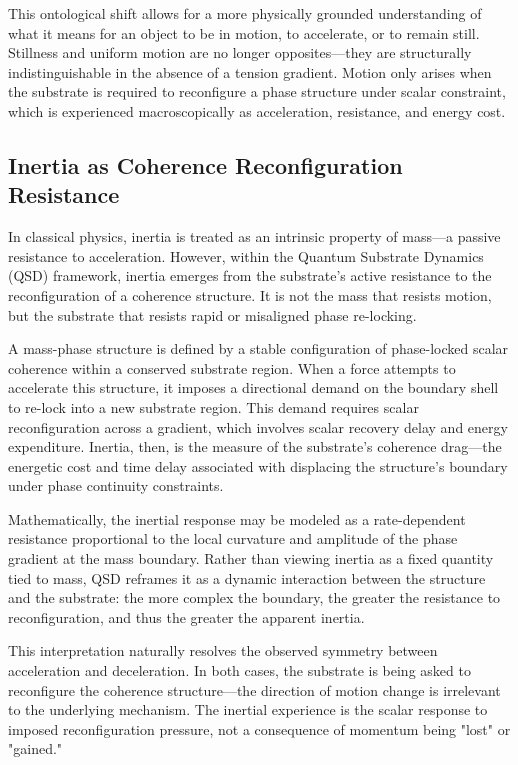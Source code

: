 \documentclass[entropy,article,submit,pdftex,moreauthors]{Definitions/mdpi}
\begin{document}
This ontological shift allows for a more physically grounded understanding of what it means for an object to be in motion, to accelerate, or to remain still. Stillness and uniform motion are no longer opposites—they are structurally indistinguishable in the absence of a tension gradient. Motion only arises when the substrate is required to reconfigure a phase structure under scalar constraint, which is experienced macroscopically as acceleration, resistance, and energy cost.
\subsection{Inertia as Coherence Reconfiguration Resistance}

In classical physics, inertia is treated as an intrinsic property of mass---a passive resistance to acceleration. However, within the Quantum Substrate Dynamics (QSD) framework, inertia emerges from the substrate’s active resistance to the reconfiguration of a coherence structure. It is not the mass that resists motion, but the substrate that resists rapid or misaligned phase re-locking.

A mass-phase structure is defined by a stable configuration of phase-locked scalar coherence within a conserved substrate region. When a force attempts to accelerate this structure, it imposes a directional demand on the boundary shell to re-lock into a new substrate region. This demand requires scalar reconfiguration across a gradient, which involves scalar recovery delay and energy expenditure. Inertia, then, is the measure of the substrate’s coherence drag---the energetic cost and time delay associated with displacing the structure’s boundary under phase continuity constraints.

Mathematically, the inertial response may be modeled as a rate-dependent resistance proportional to the local curvature and amplitude of the phase gradient at the mass boundary. Rather than viewing inertia as a fixed quantity tied to mass, QSD reframes it as a dynamic interaction between the structure and the substrate: the more complex the boundary, the greater the resistance to reconfiguration, and thus the greater the apparent inertia.

This interpretation naturally resolves the observed symmetry between acceleration and deceleration. In both cases, the substrate is being asked to reconfigure the coherence structure---the direction of motion change is irrelevant to the underlying mechanism. The inertial experience is the scalar response to imposed reconfiguration pressure, not a consequence of momentum being "lost" or "gained."
\end{document}
